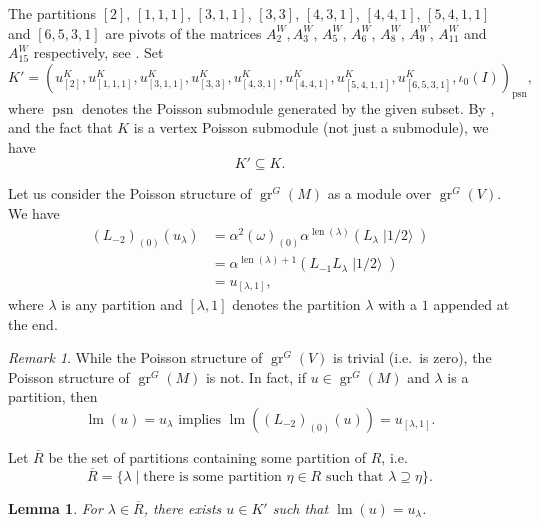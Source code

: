 \documentclass[a4paper, 12pt, reqno]{amsart}
\newtheorem{lemma}[theorem]{Lemma}
\theoremstyle{remark}
\newtheorem{remark}[theorem]{Remark}
\numberwithin{equation}{subsection}
\DeclareMathOperator{\gr}{gr}
\DeclareMathOperator{\lm}{lm}
\DeclareMathOperator{\len}{len}
\DeclareMathOperator{\psn}{psn}
\DeclareMathOperator{\vachalf}{|1/2\rangle}
\begin{document}
The partitions $[2]$, $[1, 1, 1]$, $[3, 1, 1]$, $[3, 3]$, $[4, 3, 1]$, $[4, 4, 1]$, $[5, 4, 1, 1]$ and $[6, 5, 3, 1]$ are pivots of the matrices $A^W_2, A^W_3$, $A^W_5$, $A^W_6$, $A^W_8$, $A^W_9$, $A^W_{11}$ and $A^W_{15}$ respectively, see \cite[ising-modules.ipynb]{sagemath2}.
Set
\begin{equation*}
  K' = (u^K_{[2]}, u^K_{[1, 1, 1]}, u^K_{[3, 1, 1]}, u^K_{[3, 3]}, u^K_{[4, 3, 1]}, u^K_{[4, 4, 1]}, u^K_{[5, 4, 1, 1]}, u^K_{[6, 5, 3, 1]}, \iota_0(I))_{\psn},
\end{equation*}
where $\psn$ denotes the Poisson submodule generated by the given subset.
By ,  and the fact that $K$ is a vertex Poisson submodule (not just a submodule), we have
\begin{equation*}
K' \subseteq K.
\end{equation*}

Let us consider the Poisson structure of $\gr^G(M)$ as a module over $\gr^G(V)$.
We have
\begin{align*}
  (L_{-2})_{(0)}(u_{\lambda}) &= \alpha^2(\omega)_{(0)}\alpha^{\len(\lambda)}(L_{\lambda}\vachalf) \\
  &= \alpha^{\len(\lambda) + 1}(L_{-1}L_{\lambda}\vachalf) \\
  &= u_{[\lambda, 1]},
\end{align*}
where $\lambda$ is any partition and $[\lambda, 1]$ denotes the partition $\lambda$ with a $1$ appended at the end.

\begin{remark}
  \label{rmk:41}
  While the Poisson structure of $\gr^G(V)$ is trivial (i.e.\ is zero), the Poisson structure of $\gr^G(M)$ is not.
  In fact, if $u \in \gr^G(M)$ and $\lambda$ is a partition, then
  \begin{equation*}
    \lm(u) = u_{\lambda}\text{ implies }\lm((L_{-2})_{(0)}(u)) = u_{[\lambda, 1]}.
  \end{equation*}
\end{remark}

Let $\overline{R}$ be the set of partitions containing some partition of $R$, i.e.
\begin{equation*}
  \overline{R} = \{\lambda \mid \text{there is some partition }\eta \in R\text{ such that }\lambda \supseteq \eta\}.
\end{equation*}

\begin{lemma}
  \label{lmm:29}
  For $\lambda \in \overline{R}$, there exists $u \in K'$ such that $\lm(u) = u_{\lambda}$.
\end{lemma}
\end{document}
